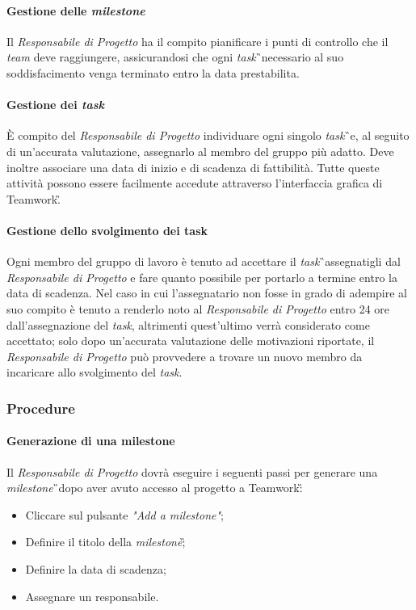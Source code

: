 \paragraph{Gestione delle \textit{milestone}} 
Il \textit{Responsabile di Progetto} ha il compito pianificare i punti di controllo che il \textit{team} deve raggiungere, assicurandosi che ogni \textit{task}\G\ necessario al suo soddisfacimento venga terminato entro la data prestabilita.

\paragraph{Gestione dei \textit{task}} 
È compito del \textit{Responsabile di Progetto} individuare ogni singolo \textit{task}\G\ e, al seguito di un'accurata valutazione, assegnarlo al membro del gruppo più adatto. Deve inoltre associare una data di inizio e di scadenza di fattibilità. Tutte queste attività possono essere facilmente accedute attraverso l'interfaccia grafica di Teamwork\G.

\paragraph{Gestione dello svolgimento dei task}
Ogni membro del gruppo di lavoro è tenuto ad accettare il \textit{task}\G\ assegnatigli dal \textit{Responsabile di Progetto} e fare quanto possibile per portarlo a termine entro la data di scadenza. Nel caso in cui l'assegnatario non fosse in grado di adempire al suo compito è tenuto a renderlo noto al \textit{Responsabile di Progetto} entro 24 ore dall'assegnazione del \textit{task}, altrimenti quest'ultimo verrà considerato come accettato; solo dopo un'accurata valutazione delle motivazioni riportate, il \textit{Responsabile di Progetto} può provvedere a trovare un nuovo membro da incaricare allo svolgimento del \textit{task}.

\subsubsection{Procedure}
\paragraph{Generazione di una milestone}
Il \textit{Responsabile di Progetto} dovrà eseguire i seguenti passi per generare una \textit{milestone}\G\ dopo aver avuto accesso al progetto a Teamwork\G:
\begin{itemize}
\item Cliccare sul pulsante \textit{"Add a milestone"};
\item Definire il titolo della \textit{milestone}\G;
\item Definire la data di scadenza;
\item Assegnare un responsabile.
\end{itemize}

